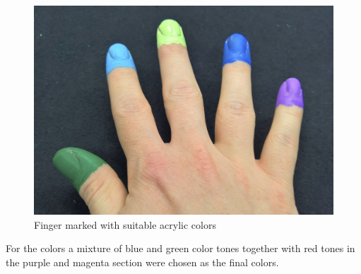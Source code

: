 \begin{figure}[H]
\includegraphics[scale=0.05]{images/final_finger_markers.jpg}
\centering
\caption{Finger marked with suitable acrylic colors}
\label{img:final_markers}
\end{figure}
For the colors a mixture of blue and green color tones together with red tones in the purple and magenta section were chosen as the final colors.
